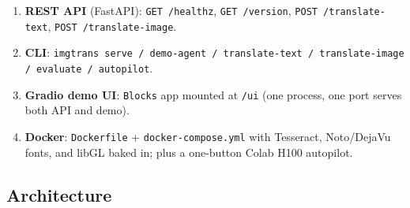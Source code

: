 \documentclass[12pt,a4paper]{article}
\begin{document}
\begin{enumerate}
  \item \textbf{REST API} (FastAPI): \texttt{GET /healthz}, \texttt{GET /version}, \texttt{POST /translate-text}, \texttt{POST /translate-image}.
  \item \textbf{CLI}: \texttt{imgtrans serve / demo-agent / translate-text / translate-image / evaluate / autopilot}.
  \item \textbf{Gradio demo UI}: \texttt{Blocks} app mounted at \texttt{/ui} (one process, one port serves both API and demo).
  \item \textbf{Docker}: \texttt{Dockerfile} + \texttt{docker-compose.yml} with Tesseract, Noto/DejaVu fonts, and libGL baked in; plus a one-button Colab H100 autopilot.
\end{enumerate}

\subsection{Architecture}
\end{document}
